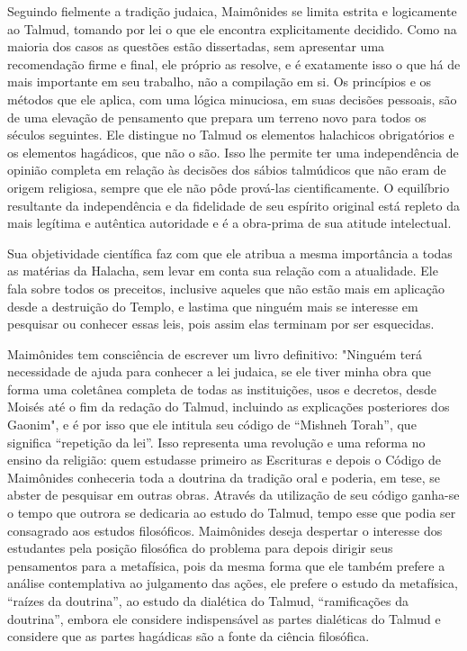 Seguindo fielmente a tradição judaica, Maimônides se limita estrita e
logicamente ao Talmud, tomando por lei o que ele encontra explicitamente
decidido. Como na maioria dos casos as questões estão dissertadas, sem
apre­sentar uma recomendação firme e final, ele próprio as resolve, e é
exatamente isso o que há de mais importante em seu trabalho, não a
compilação em si. Os princípios e os métodos que ele aplica, com uma
lógica minuciosa, em suas de­cisões pessoais, são de uma elevação de
pensamento que prepara um terreno novo para todos os séculos seguintes.
Ele distingue no Talmud os elementos halachicos obrigatórios e os
elementos hagádicos, que não o são. Isso lhe per­mite ter uma
independência de opinião completa em relação às decisões dos sábios
talmúdicos que não eram de origem religiosa, sempre que ele não pôde
prová-las cientificamente. O equilíbrio resultante da independência e da
fideli­dade de seu espírito original está repleto da mais legítima e
autêntica autorida­de e é a obra-prima de sua atitude intelectual.

Sua objetividade científica faz com que ele atribua a mesma impor­tância
a todas as matérias da Halacha, sem levar em conta sua relação com a
atualidade. Ele fala sobre todos os preceitos, inclusive aqueles que não
estão mais em aplicação desde a destruição do Templo, e lastima que
ninguém mais se interesse em pesquisar ou conhecer essas leis, pois
assim elas terminam por ser esquecidas.

Maimônides tem consciência de escrever um livro definitivo: "Nin­guém
terá necessidade de ajuda para conhecer a lei judaica, se ele tiver
minha obra que forma uma coletânea completa de todas as instituições,
usos e decre­tos, desde Moisés até o fim da redação do Talmud, incluindo
as explicações posteriores dos Gaonim", e é por isso que ele intitula
seu código de ``Mishneh Torah'', que significa ``repetição da lei''. Isso
representa uma revolução e uma reforma no ensino da religião: quem
estudasse primeiro as Escrituras e depois o Código de Maimônides
conheceria toda a doutrina da tradição oral e poderia, em tese, se
abster de pesquisar em outras obras. Através da utilização de seu código
ganha-se o tempo que outrora se dedicaria ao estudo do Talmud, tem­po
esse que podia ser consagrado aos estudos filosóficos. Maimônides deseja
despertar o interesse dos estudantes pela posição filosófica do problema
para depois dirigir seus pensamentos para a metafísica, pois da mesma
forma que ele também prefere a análise contemplativa ao julgamento das
ações, ele prefe­re o estudo da metafísica, ``raízes da doutrina'', ao
estudo da dialética do Tal­mud, ``ramificações da doutrina'', embora ele
considere indispensável as par­tes dialéticas do Talmud e considere que
as partes hagádicas são a fonte da ciência filosófica.

